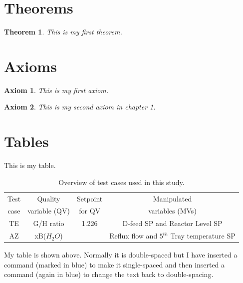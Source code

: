 \section{Theorems}

\newtheorem{theorem}{Theorem}[chapter]
\begin{theorem}
This is my first theorem.
\end{theorem}


\section{Axioms}
\newtheorem{axiom}{Axiom}[chapter]
\begin{axiom}
This is my first axiom.
\end{axiom}

\begin{axiom}
This is my second axiom in chapter 1.
\end{axiom}

\section{Tables}

This is my table. 

\renewcommand{\baselinestretch}{1}
\small\normalsize

\begin{table}[h]
\caption[Short title]{Overview of test cases used in this study.}
\begin{center}
\begin{tabular}{|c|c|c|c|}
\hline
Test & Quality & Setpoint & Manipulated \\
case & variable (QV) & for QV & variables (MVs)\\
\hline \hline
TE & G/H ratio & 1.226 & D-feed SP and Reactor Level SP\\
AZ & xB($H_2O$) & & Reflux flow and $5^{th}$ Tray temperature SP\\  
\hline
\end{tabular}
\end{center}
\label{test_over}
\end{table}

\renewcommand{\baselinestretch}{2}
\small\normalsize

My table is shown above.   Normally it is double-spaced but I have inserted a command (marked in blue) to make it single-spaced and then inserted a command (again in blue) to change the text back to double-spacing.

\

